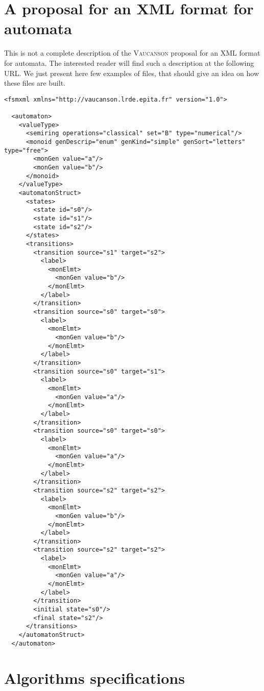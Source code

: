 \documentclass[a4paper]{report}
\newcommand{\Vauc}{\textsc{Vaucanson}\xspace}
\begin{document}
\chapter{A proposal for an XML format for automata}
\label{sec:xml}

This is not a complete description of the \Vauc proposal for an XML
format for automata.  The interested reader will find such a
description at the following URL.  We just present here few examples
of files, that should give an idea on how these files are built.

\begin{lstlisting}
<fsmxml xmlns="http://vaucanson.lrde.epita.fr" version="1.0">

  <automaton>
    <valueType>
      <semiring operations="classical" set="B" type="numerical"/>
      <monoid genDescrip="enum" genKind="simple" genSort="letters" type="free">
        <monGen value="a"/>
        <monGen value="b"/>
      </monoid>
    </valueType>
    <automatonStruct>
      <states>
        <state id="s0"/>
        <state id="s1"/>
        <state id="s2"/>
      </states>
      <transitions>
        <transition source="s1" target="s2">
          <label>
            <monElmt>
              <monGen value="b"/>
            </monElmt>
          </label>
        </transition>
        <transition source="s0" target="s0">
          <label>
            <monElmt>
              <monGen value="b"/>
            </monElmt>
          </label>
        </transition>
        <transition source="s0" target="s1">
          <label>
            <monElmt>
              <monGen value="a"/>
            </monElmt>
          </label>
        </transition>
        <transition source="s0" target="s0">
          <label>
            <monElmt>
              <monGen value="a"/>
            </monElmt>
          </label>
        </transition>
        <transition source="s2" target="s2">
          <label>
            <monElmt>
              <monGen value="b"/>
            </monElmt>
          </label>
        </transition>
        <transition source="s2" target="s2">
          <label>
            <monElmt>
              <monGen value="a"/>
            </monElmt>
          </label>
        </transition>
        <initial state="s0"/>
        <final state="s2"/>
      </transitions>
    </automatonStruct>
  </automaton>

\end{lstlisting}

\chapter{Algorithms specifications}
\label{chap:specification}
\end{document}
